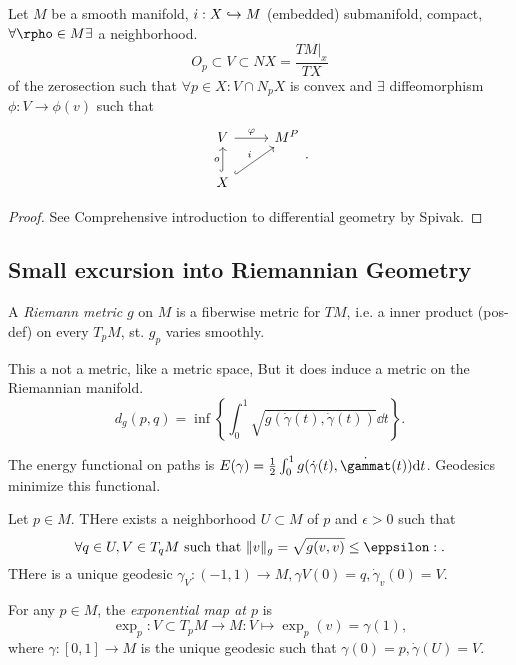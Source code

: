 \begin{proposition}
	Let $M$ be a smooth manifold, $i: X \hookrightarrow M$ (embedded) submanifold, compact, $\forall  \rpho \in M \exists $ a neighborhood.\[
	O_p \subset V \subset NX = \frac{TM|_x}{TX}
	\] 
	of the zerosection such that $\forall p \in X: V\cap N_pX$ is convex and $\exists $ diffeomorphism $\phi:V \to \phi(v)$
	such that \[
	\begin{tikzcd}
		V \arrow[r, "\phi"] & M^{P} \\
		X \arrow[u, hookrightarrow, "o"] \arrow[ur, hookrightarrow,"i"]
	\end{tikzcd}
	.\] 
\end{proposition}
\begin{proof}
	See Comprehensive introduction to differential geometry by Spivak.
\end{proof}
\subsection{Small excursion into Riemannian Geometry} \label{sec:small_excursion_into_riemannian_geometry}
\begin{definition}
	A \emph{Riemann metric} $g$ on $M$ is a fiberwise metric for $TM$, i.e. a inner product (pos-def) on every $T_pM$, st. $g_p$ varies smoothly.	
\end{definition}
\begin{note}
	This a not a metric, like a metric space, But it does induce a metric on the Riemannian manifold.
	\[
		d_g(p, q) = \inf \left\{\int_0^{1}\sqrt{g(\dot\gamma(t), \dot\gamma(t))}\dd t \right\} 
	.\] 

	The energy functional on paths is $E(\gamma) = \frac{1}{2} \int_0^{1}g(\dot\gamma(t), \dot\gammat(t)) \dd t$. 
	Geodesics minimize this functional.
\end{note}
\begin{theorem}
	Let $p \in M$. THere exists a neighborhood $U \subset M$ of  $p$ and $\epsilon > 0$ such that  \[
		\forall q \in U, V \in T_qM \text{ such that }\|v\|_g = \sqrt{g(v, v)}  \le \eppsilon:
	.\] 
	THere is a unique geodesic $\gamma_V:(-1, 1) \to M, \gamma V(0) = q, \dot \gamma_v(0) = V$.
\end{theorem}
\begin{definition}
	For any $p \in M$, the \emph{exponential map at $p$ } is \[
		\exp_p: V \subset T_pM \to M: V\mapsto \exp_p(v) = \gamma(1)
	,\]
	where $\gamma:[0,1] \to M$ is the unique geodesic such that $\gamma(0) = p ,\dot\gamma(U) = V$. 
\end{definition}

